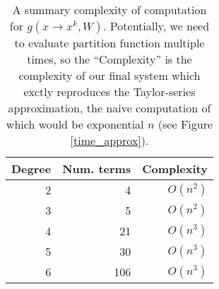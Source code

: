 \begin{table}[t]
\tiny
\centering
\begin{tabular}{rrr}
\hline
Degree & Num. terms & Complexity \\
\hline
2 & 4 & $O(n^2)$\\
3 & 5 & $O(n^2)$\\
4 & 21 & $O(n^3)$\\
5 & 30 & $O(n^3)$\\
6 & 106 & $O(n^3)$\\
\hline
\end{tabular}
\caption{A summary complexity of computation for $g(x \rightarrow x^k, W)$.
  Potentially, we need to evaluate partition function multiple times, so the ``Complexity''
  is the complexity of our final system which exctly reproduces the
  Taylor-series approximation, the naive computation of which would be
  exponential $n$ (see Figure \ref{time_approx}).} 
\label{eval}
\vspace{-4mm}
\end{table}


